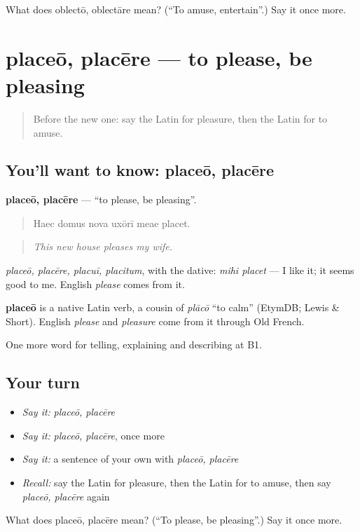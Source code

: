 \begin{tcolorbox}[breakable,colback=teal!4,colframe=teal!35!black,title={Before you move on}]
What does oblectō, oblectāre mean? (\textquotedblleft{}To amuse, entertain\textquotedblright{}.) Say it once more.
\end{tcolorbox}
\section[placeō, placēre]{placeō, placēre — to please, be pleasing}

\label{lesson:LA-C499-placeo}



\begin{quote}
Before the new one: say the Latin for pleasure, then the Latin for to amuse.
\end{quote}

\subsection*{You'll want to know: placeō, placēre}
\textbf{placeō, placēre} — \textquotedblleft{}to please, be pleasing\textquotedblright{}.

\begin{quote}
Haec domus nova uxōrī meae placet.
\end{quote}

\begin{quote}
\emph{This new house pleases my wife.}
\end{quote}

\emph{placeō, placēre, placuī, placitum}, with the dative: \emph{mihi placet} — I like it; it seems good to me. English \emph{please} comes from it.

\begin{cousinweb}
\textbf{placeō} is a native Latin verb, a cousin of \emph{plācō} \textquotedblleft{}to calm\textquotedblright{} (EtymDB; Lewis \& Short). English \emph{please} and \emph{pleasure} come from it through Old French.
\end{cousinweb}

\begin{grammarlens}[title={What you've built}]
One more word for telling, explaining and describing at B1.
\end{grammarlens}

\subsection*{Your turn}
\begin{itemize}
\raggedright
  \item \emph{Say it:} \emph{placeō, placēre}
  \item \emph{Say it:} \emph{placeō, placēre}, once more
  \item \emph{Say it:} a sentence of your own with \emph{placeō, placēre}
  \item \emph{Recall:} say the Latin for pleasure, then the Latin for to amuse, then say \emph{placeō, placēre} again
\end{itemize}

\begin{tcolorbox}[breakable,colback=teal!4,colframe=teal!35!black,title={Before you move on}]
What does placeō, placēre mean? (\textquotedblleft{}To please, be pleasing\textquotedblright{}.) Say it once more.
\end{tcolorbox}
